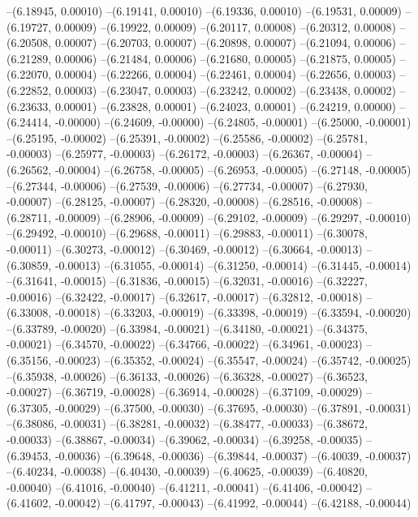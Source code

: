 --(6.18945, 0.00010)
--(6.19141, 0.00010)
--(6.19336, 0.00010)
--(6.19531, 0.00009)
--(6.19727, 0.00009)
--(6.19922, 0.00009)
--(6.20117, 0.00008)
--(6.20312, 0.00008)
--(6.20508, 0.00007)
--(6.20703, 0.00007)
--(6.20898, 0.00007)
--(6.21094, 0.00006)
--(6.21289, 0.00006)
--(6.21484, 0.00006)
--(6.21680, 0.00005)
--(6.21875, 0.00005)
--(6.22070, 0.00004)
--(6.22266, 0.00004)
--(6.22461, 0.00004)
--(6.22656, 0.00003)
--(6.22852, 0.00003)
--(6.23047, 0.00003)
--(6.23242, 0.00002)
--(6.23438, 0.00002)
--(6.23633, 0.00001)
--(6.23828, 0.00001)
--(6.24023, 0.00001)
--(6.24219, 0.00000)
--(6.24414, -0.00000)
--(6.24609, -0.00000)
--(6.24805, -0.00001)
--(6.25000, -0.00001)
--(6.25195, -0.00002)
--(6.25391, -0.00002)
--(6.25586, -0.00002)
--(6.25781, -0.00003)
--(6.25977, -0.00003)
--(6.26172, -0.00003)
--(6.26367, -0.00004)
--(6.26562, -0.00004)
--(6.26758, -0.00005)
--(6.26953, -0.00005)
--(6.27148, -0.00005)
--(6.27344, -0.00006)
--(6.27539, -0.00006)
--(6.27734, -0.00007)
--(6.27930, -0.00007)
--(6.28125, -0.00007)
--(6.28320, -0.00008)
--(6.28516, -0.00008)
--(6.28711, -0.00009)
--(6.28906, -0.00009)
--(6.29102, -0.00009)
--(6.29297, -0.00010)
--(6.29492, -0.00010)
--(6.29688, -0.00011)
--(6.29883, -0.00011)
--(6.30078, -0.00011)
--(6.30273, -0.00012)
--(6.30469, -0.00012)
--(6.30664, -0.00013)
--(6.30859, -0.00013)
--(6.31055, -0.00014)
--(6.31250, -0.00014)
--(6.31445, -0.00014)
--(6.31641, -0.00015)
--(6.31836, -0.00015)
--(6.32031, -0.00016)
--(6.32227, -0.00016)
--(6.32422, -0.00017)
--(6.32617, -0.00017)
--(6.32812, -0.00018)
--(6.33008, -0.00018)
--(6.33203, -0.00019)
--(6.33398, -0.00019)
--(6.33594, -0.00020)
--(6.33789, -0.00020)
--(6.33984, -0.00021)
--(6.34180, -0.00021)
--(6.34375, -0.00021)
--(6.34570, -0.00022)
--(6.34766, -0.00022)
--(6.34961, -0.00023)
--(6.35156, -0.00023)
--(6.35352, -0.00024)
--(6.35547, -0.00024)
--(6.35742, -0.00025)
--(6.35938, -0.00026)
--(6.36133, -0.00026)
--(6.36328, -0.00027)
--(6.36523, -0.00027)
--(6.36719, -0.00028)
--(6.36914, -0.00028)
--(6.37109, -0.00029)
--(6.37305, -0.00029)
--(6.37500, -0.00030)
--(6.37695, -0.00030)
--(6.37891, -0.00031)
--(6.38086, -0.00031)
--(6.38281, -0.00032)
--(6.38477, -0.00033)
--(6.38672, -0.00033)
--(6.38867, -0.00034)
--(6.39062, -0.00034)
--(6.39258, -0.00035)
--(6.39453, -0.00036)
--(6.39648, -0.00036)
--(6.39844, -0.00037)
--(6.40039, -0.00037)
--(6.40234, -0.00038)
--(6.40430, -0.00039)
--(6.40625, -0.00039)
--(6.40820, -0.00040)
--(6.41016, -0.00040)
--(6.41211, -0.00041)
--(6.41406, -0.00042)
--(6.41602, -0.00042)
--(6.41797, -0.00043)
--(6.41992, -0.00044)
--(6.42188, -0.00044)

